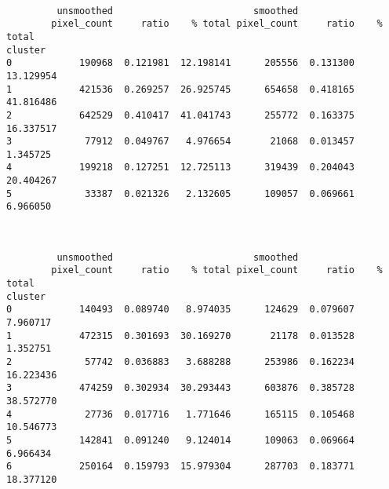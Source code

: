 \documentclass[11pt]{article}
\begin{document}
    
    \begin{center}
    \end{center}
    { \hspace*{\fill} \\}
    
    
    \begin{verbatim}
         unsmoothed                         smoothed                     
        pixel_count     ratio    % total pixel_count     ratio    % total
cluster                                                                  
0            190968  0.121981  12.198141      205556  0.131300  13.129954
1            421536  0.269257  26.925745      654658  0.418165  41.816486
2            642529  0.410417  41.041743      255772  0.163375  16.337517
3             77912  0.049767   4.976654       21068  0.013457   1.345725
4            199218  0.127251  12.725113      319439  0.204043  20.404267
5             33387  0.021326   2.132605      109057  0.069661   6.966050
    \end{verbatim}

    
    \begin{center}
    \end{center}
    { \hspace*{\fill} \\}
    
    
    \begin{verbatim}
         unsmoothed                         smoothed                     
        pixel_count     ratio    % total pixel_count     ratio    % total
cluster                                                                  
0            140493  0.089740   8.974035      124629  0.079607   7.960717
1            472315  0.301693  30.169270       21178  0.013528   1.352751
2             57742  0.036883   3.688288      253986  0.162234  16.223436
3            474259  0.302934  30.293443      603876  0.385728  38.572770
4             27736  0.017716   1.771646      165115  0.105468  10.546773
5            142841  0.091240   9.124014      109063  0.069664   6.966434
6            250164  0.159793  15.979304      287703  0.183771  18.377120
    \end{verbatim}

    
    \begin{center}
    \end{center}
    { \hspace*{\fill} \\}
    
\end{document}
